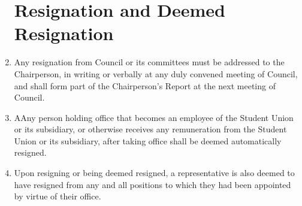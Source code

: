 \documentclass[oneside]{book}
\begin{document}
\begin{enumerate}
\chapter{\label{Resignation_and_Deemed_Resignation}Resignation and Deemed
Resignation}
\item Any resignation from Council or its committees must be addressed to the Chairperson, 
in writing or verbally at any duly convened meeting of Council, and shall form part of the 
Chairperson's Report at the next meeting of Council. 
\item AAny person holding office that becomes an employee of the Student Union or its 
subsidiary, or otherwise receives any remuneration from the Student Union or its subsidiary, 
after taking office shall be deemed automatically resigned.
\item Upon resigning or being deemed resigned, a representative is also deemed to have resigned 
from any and all positions to which they had been appointed by virtue of their office.


\end{enumerate}
\end{document}
